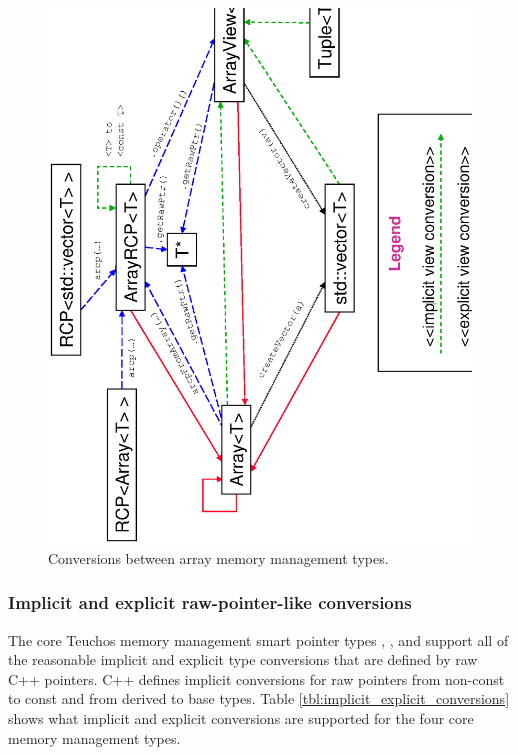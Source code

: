 \documentclass[pdf,ps2pdf,11pt]{SANDreport}
\begin{document}
{\bsinglespace
\begin{figure}
\begin{center}
\includegraphics*[angle=270,scale=0.65]{TeuchosArrayConversions}
\end{center}
\caption{
\label{fig:TeuchosArrayConversions}
Conversions between array memory management types.  }
\end{figure}
\esinglespace}


%
{}\subsubsection{Implicit and explicit raw-pointer-like conversions}
\label{sec:raw-pointer-like-type-conversions}
%

The core Teuchos memory management smart pointer types {},
{}, {} and {} support all of the
reasonable implicit and explicit type conversions that are defined by
raw C++ pointers.  C++ defines implicit conversions for raw pointers
from non-const to const and from derived to base types.  Table
{}\ref{tbl:implicit_explicit_conversions} shows what implicit and
explicit conversions are supported for the four core memory management
types.
\end{document}
